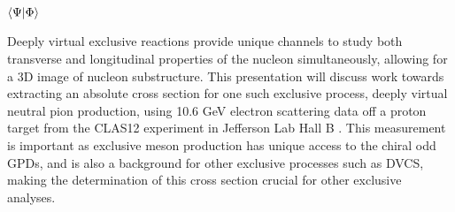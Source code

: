 % 
% 
%



{\fontsize{180}{240} \selectfont  $\braket{\Psi | \Phi}$}

Deeply virtual exclusive reactions provide unique channels to study both transverse and longitudinal properties of the nucleon simultaneously, allowing for a 3D image of nucleon substructure. This presentation will discuss work towards extracting an absolute cross section for one such exclusive process, deeply virtual neutral pion production, using 10.6 GeV electron scattering data off a proton target from the CLAS12 experiment in Jefferson Lab Hall B . This measurement is important as exclusive meson production has unique access to the chiral odd GPDs, and is also a background for other exclusive processes such as DVCS, making the determination of this cross section crucial for other exclusive analyses.
